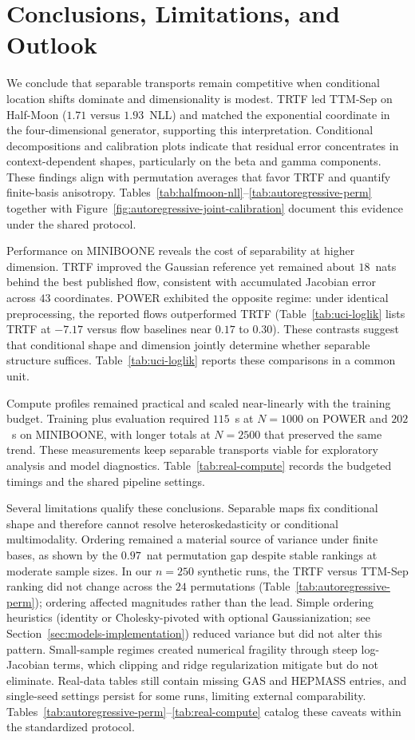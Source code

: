 \documentclass[11pt,a4paper,twoside]{book}\usepackage[]{graphicx}\usepackage[]{xcolor}
\begin{document}
\section{Conclusions, Limitations, and Outlook}\label{sec:conclusion-outlook}
We conclude that separable transports remain competitive when conditional location shifts dominate and dimensionality is modest. TRTF led TTM-Sep on Half-Moon ($1.71$ versus $1.93$~NLL) and matched the exponential coordinate in the four-dimensional generator, supporting this interpretation. Conditional decompositions and calibration plots indicate that residual error concentrates in context-dependent shapes, particularly on the beta and gamma components. These findings align with permutation averages that favor TRTF and quantify finite-basis anisotropy. Tables~\ref{tab:halfmoon-nll}--\ref{tab:autoregressive-perm} together with Figure~\ref{fig:autoregressive-joint-calibration} document this evidence under the shared protocol.

Performance on MINIBOONE reveals the cost of separability at higher dimension. TRTF improved the Gaussian reference yet remained about $18$~nats behind the best published flow, consistent with accumulated Jacobian error across $43$ coordinates. POWER exhibited the opposite regime: under identical preprocessing, the reported flows outperformed TRTF (Table~\ref{tab:uci-loglik} lists TRTF at $-7.17$ versus flow baselines near $0.17$ to $0.30$). These contrasts suggest that conditional shape and dimension jointly determine whether separable structure suffices. Table~\ref{tab:uci-loglik} reports these comparisons in a common unit.

Compute profiles remained practical and scaled near-linearly with the training budget. Training plus evaluation required $115$~s at $N=1000$ on POWER and $202$~s on MINIBOONE, with longer totals at $N=2500$ that preserved the same trend. These measurements keep separable transports viable for exploratory analysis and model diagnostics. Table~\ref{tab:real-compute} records the budgeted timings and the shared pipeline settings.

Several limitations qualify these conclusions. Separable maps fix conditional shape and therefore cannot resolve heteroskedasticity or conditional multimodality. Ordering remained a material source of variance under finite bases, as shown by the $0.97$~nat permutation gap despite stable rankings at moderate sample sizes. In our $n=250$ synthetic runs, the TRTF versus TTM-Sep ranking did not change across the $24$ permutations (Table~\ref{tab:autoregressive-perm}); ordering affected magnitudes rather than the lead. Simple ordering heuristics (identity or Cholesky-pivoted with optional Gaussianization; see Section~\ref{sec:models-implementation}) reduced variance but did not alter this pattern. Small-sample regimes created numerical fragility through steep log-Jacobian terms, which clipping and ridge regularization mitigate but do not eliminate. Real-data tables still contain missing GAS and HEPMASS entries, and single-seed settings persist for some runs, limiting external comparability. Tables~\ref{tab:autoregressive-perm}--\ref{tab:real-compute} catalog these caveats within the standardized protocol.
\end{document}
